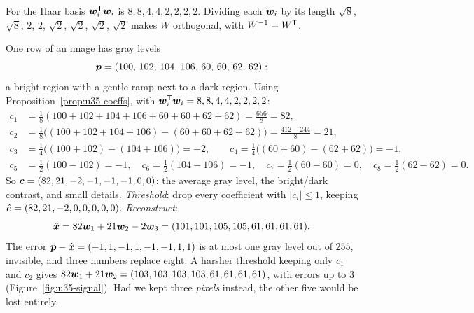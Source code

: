 For the Haar basis $\boldsymbol{w}_i^{\mathsf{T}}\boldsymbol{w}_i$ is $8,8,4,4,2,2,2,2$. Dividing each $\boldsymbol{w}_i$ by its length $\sqrt8$,
$\sqrt8$, $2$, $2$, $\sqrt2$, $\sqrt2$, $\sqrt2$, $\sqrt2$ makes $W$ orthogonal, with $W^{-1}=W^{\mathsf{T}}$.

\begin{example}\label{ex:u35-compress}
One row of an image has gray levels
\[
  \boldsymbol{p}=(100,\,102,\,104,\,106,\,60,\,60,\,62,\,62):
\]
a bright region with a gentle ramp next to a dark region. Using
Proposition~\ref{prop:u35-coeffs}, with $\boldsymbol{w}_i^{\mathsf{T}}\boldsymbol{w}_i=8,8,4,4,2,2,2,2$:
\begin{align*}
  c_1&=\tfrac18(100+102+104+106+60+60+62+62)=\tfrac{656}{8}=82,\\
  c_2&=\tfrac18\bigl((100+102+104+106)-(60+60+62+62)\bigr)=\tfrac{412-244}{8}=21,\\
  c_3&=\tfrac14\bigl((100+102)-(104+106)\bigr)=-2,\qquad
  c_4=\tfrac14\bigl((60+60)-(62+62)\bigr)=-1,\\
  c_5&=\tfrac12(100-102)=-1,\quad c_6=\tfrac12(104-106)=-1,\quad
  c_7=\tfrac12(60-60)=0,\quad c_8=\tfrac12(62-62)=0 .
\end{align*}
So $\boldsymbol{c}=(82,21,-2,-1,-1,-1,0,0)$: the average gray level, the bright/dark contrast, and small
details. \emph{Threshold}: drop every coefficient with $|c_i|\le1$, keeping $\hat{\boldsymbol{c}}=(82,21,-2,0,0,0,0,0)$.
\emph{Reconstruct}:
\[
  \hat{\boldsymbol{x}}=82\boldsymbol{w}_1+21\boldsymbol{w}_2-2\boldsymbol{w}_3=(101,101,105,105,61,61,61,61).
\]
The error $\boldsymbol{p}-\hat{\boldsymbol{x}}=(-1,1,-1,1,-1,-1,1,1)$ is at most one gray level out of $255$, invisible,
and three numbers replace eight. A harsher threshold keeping only $c_1$ and $c_2$ gives
$82\boldsymbol{w}_1+21\boldsymbol{w}_2=(103,103,103,103,61,61,61,61)$, with errors up to $3$
(Figure~\ref{fig:u35-signal}). Had we kept
three \emph{pixels} instead, the other five would be lost entirely.
\end{example}

